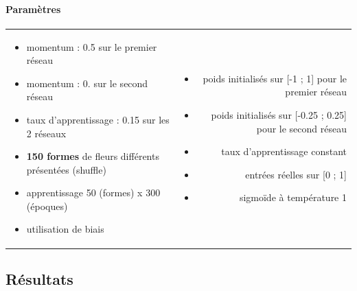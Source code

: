     \paragraph{Paramètres}
      \begin{center}
	\begin{tabular}{lr}
	  \begin{minipage}{230px}
	    \begin{itemize}
	      \item momentum : 0.5 sur le premier réseau
	      \item momentum : 0. sur le second réseau
	      \item taux d'apprentissage : 0.15 sur les 2 réseaux
	      \item \textbf{150 formes} de fleurs différents présentées (shuffle) \cite{Iris}
	      \item apprentissage 50 (formes) x 300 (époques)
	      \item utilisation de biais
	      
	    \end{itemize}
	  \end{minipage}
	  &
	  \begin{minipage}{230px}
	    \begin{itemize}
	      \item poids initialisés sur [-1 ; 1] pour le premier réseau
	      \item poids initialisés sur [-0.25 ; 0.25] pour le second réseau
	      \item taux d'apprentissage constant
	      \item entrées réelles sur [0 ; 1]
	      \item sigmoïde à température 1
	    \end{itemize}
	  \end{minipage}
	\end{tabular}
      \end{center}

  
  \newpage
  \subsection{Résultats}
